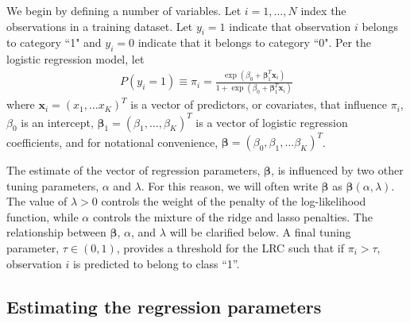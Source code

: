 \documentclass{article}
\begin{document}
We begin by defining a
number of variables.  Let $i = 1,\ldots,N$ index the observations in a training dataset. 
Let $y_i = 1$ indicate that observation $i$ belongs to category ``1" and $y_i = 0$ indicate
that it belongs to category ``0".  Per the logistic regression model, let  
\begin{align}
P(y_i = 1) \equiv \pi_i = 
\frac{\exp(\beta_0 + \boldsymbol{\beta}_1^T \mathbf{x}_i)}{1+\exp(\beta_0 + \boldsymbol{\beta}_1^T \mathbf{x}_i)}
\end{align}
\noindent where $\mathbf{x}_i = (x_1, \ldots x_K)^T$ is a vector of predictors, or covariates, that
influence $\pi_i$, $\beta_0$ is an intercept, $\boldsymbol{\beta}_1 = (\beta_1, \ldots, \beta_K)^T$ is a 
vector of logistic regression coefficients, and for notational convenience, 
$\boldsymbol{\beta} = (\beta_0, \beta_1, \ldots \beta_K)^T$. 

The estimate of the vector of regression parameters, $\boldsymbol{\beta}$, is influenced by two other tuning parameters, 
$\alpha$ and $\lambda$.  For this reason, we will often write $\boldsymbol\beta$ as $\boldsymbol\beta(\alpha,\lambda)$.  
The value of $\lambda > 0$ controls the weight of the
penalty of the log-likelihood function, while $\alpha$ controls the mixture of the ridge and lasso penalties.  
The relationship between $\boldsymbol{\beta}$, $\alpha$, and $\lambda$ will be clarified below.  A final tuning parameter, 
$\tau \in (0, 1)$, provides a threshold for the LRC such that if $\pi_i > \tau$, observation $i$ is predicted to belong
to class ``1''.

\subsection{Estimating the regression parameters}
\end{document}
